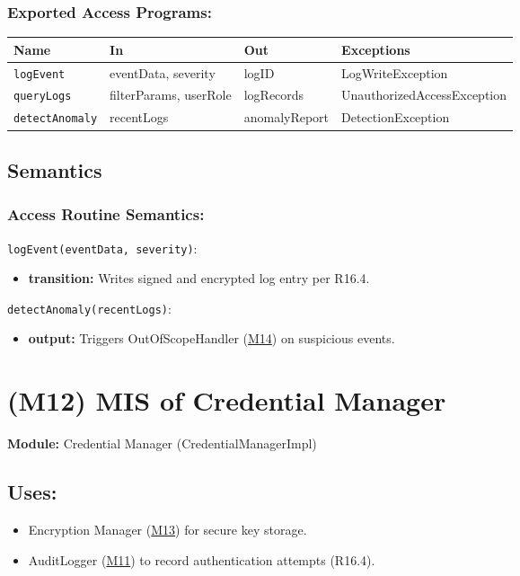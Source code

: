 \documentclass[12pt, titlepage]{article}
\begin{document}
\subsubsection{Exported Access Programs:}

\begin{tabular}{|l|l|l|l|}
\hline
\textbf{Name} & \textbf{In} & \textbf{Out} & \textbf{Exceptions} \\ \hline
\texttt{logEvent} & eventData, severity & logID & LogWriteException \\ 
\texttt{queryLogs} & filterParams, userRole & logRecords & UnauthorizedAccessException \\ 
\texttt{detectAnomaly} & recentLogs & anomalyReport & DetectionException \\ \hline
\end{tabular}

\subsection{Semantics}

\subsubsection{Access Routine Semantics:}

\noindent\texttt{logEvent(eventData, severity)}:
\begin{itemize}
\item \textbf{transition:} Writes signed and encrypted log entry per R16.4.
\end{itemize}

\noindent\texttt{detectAnomaly(recentLogs)}:
\begin{itemize}
\item \textbf{output:} Triggers OutOfScopeHandler (\hyperref[M14]{M14}) on suspicious events.
\end{itemize}



\section{(M12) MIS of Credential Manager} \label{M12}
\label{MIS:M12}

\textbf{Module:} Credential Manager (CredentialManagerImpl)

\subsection{Uses:}
\begin{itemize}
\item Encryption Manager (\hyperref[M13]{M13}) for secure key storage.
\item AuditLogger (\hyperref[M11]{M11}) to record authentication attempts (R16.4).
\end{itemize}
\end{document}
